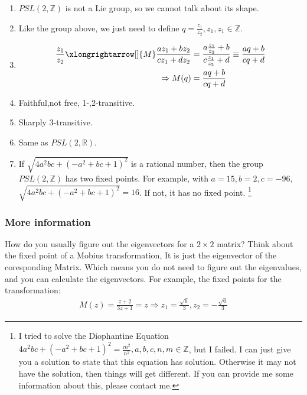\documentclass[]{ctexart}
\begin{document}
		\subsubsection{}
			\begin{enumerate}
				\item $PSL(2,\mathbb{Z})$ is not a Lie group, so we cannot talk about its shape.
				\item Like the group above, we just need to define $q=\frac{z_1}{z_2},z_1,z_1\in \mathbb{Z}$.
				\item  
					\begin{equation*}
					\begin{aligned}
						\frac{z_1}{z_2}\xlongrightarrow[]{M} \frac{az_1+bz_2}{cz_1+dz_2}&=\frac{a\frac{z_1}{z_2}+b}{c\frac{z_1}{z_2}+d}\equiv \frac{aq+b}{cq+d}\\
						\Rightarrow M(q)&=\frac{aq+b}{cq+d}
					\end{aligned}
					\end{equation*}
				\item Faithful,not free, 1-,2-transitive. 
				\item Sharply 3-transitive.
				\item Same as $PSL(2,\mathbb{R})$.
				\item If $\sqrt{4 a^2 b c+\left(-a^2+b c+1\right)^2}$ is a rational number, then the group $PSL(2,\mathbb{Z})$ has two fixed points. For example, with $a=15, b=2,c=-96$, $\sqrt{4 a^2 b c+\left(-a^2+b c+1\right)^2}=16$. If not, it has no fixed point. \footnote{I tried to solve the Diophantine Equation $4 a^2 b c+\left(-a^2+b c+1\right)^2=\frac{m^2}{n^2},a,b,c,n,m\in \mathbb{Z}$, but I failed. I can just give you a solution to state that this equation has solution. Otherwise it may not have the solution, then things will get different. If you can provide me some information about this, please contact me. }
			\end{enumerate}
		
		\subsubsection{More information}
			How do you usually figure out the eigenvectors for  a $2\times 2$ matrix? Think about the fixed point of a Mobius transformation, It is just the eigenvector of the coresponding Matrix. Which means you do not need to figure out the eigenvalues, and you can calculate the eigenvectors. For example, the fixed points for the transformation:
				\begin{equation*}
				\begin{aligned}
					M(z)=\frac{z+2}{3z+1}=z\Rightarrow z_1=\frac{\sqrt{6}}{3},z_2=-\frac{\sqrt{6}}{3}
				\end{aligned}
				\end{equation*}
			
\end{document}
